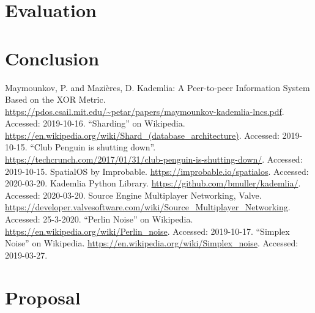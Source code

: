 \documentclass[10pt,twoside,notitlepage,a4paper]{report}
\begin{document}
	\cleardoublepage
	\chapter{Evaluation}
	
	\cleardoublepage
	\chapter{Conclusion}

	\cleardoublepage
	
	\begin{thebibliography}{9}
		 Maymounkov, P. and Mazières, D. Kademlia: A Peer-to-peer Information System Based on the XOR Metric. \url{https://pdos.csail.mit.edu/~petar/papers/maymounkov-kademlia-lncs.pdf}. Accessed: 2019-10-16.
		 ``Sharding'' on Wikipedia. \url{https://en.wikipedia.org/wiki/Shard_(database_architecture)}. Accessed: 2019-10-15.
		 ``Club Penguin is shutting down''. \url{https://techcrunch.com/2017/01/31/club-penguin-is-shutting-down/}. Accessed: 2019-10-15.
		 SpatialOS by Improbable. \url{https://improbable.io/spatialos}. Accessed: 2020-03-20.
		 Kademlia Python Library. \url{https://github.com/bmuller/kademlia/}. Accessed: 2020-03-20.
		 Source Engine Multiplayer Networking, Valve. \url{https://developer.valvesoftware.com/wiki/Source_Multiplayer_Networking}. Accessed: 25-3-2020.
		 ``Perlin Noise'' on Wikipedia. \url{https://en.wikipedia.org/wiki/Perlin_noise}. Accessed: 2019-10-17.
		 ``Simplex Noise'' on Wikipedia.
		\url{https://en.wikipedia.org/wiki/Simplex_noise}. Accessed: 2019-03-27.
	\end{thebibliography}
	\cleardoublepage
	
	\appendix
	
	\chapter{Proposal}
	
\end{document}
